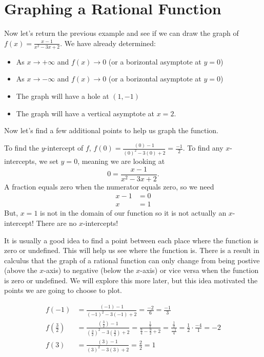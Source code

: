 \documentclass{ximera}
\begin{document}
\section{Graphing a Rational Function}

Now let's return the previous example and see if we can draw the graph of $f(x)=\frac{x-1}{x^2-3x+2}$.  We have already determined:

\begin{itemize}
\item As $x \to +\infty$ and $f(x) \to 0$ (or a borizontal asymptote at $y=0$)
\item As $x \to -\infty$ and $f(x) \to 0$ (or a borizontal asymptote at $y=0$)
\item The graph will have a hole at $(1,-1)$
\item The graph will have a vertical asymptote at $x=2$.
\end{itemize}

Now let's find a few additional points to help us graph the function.

To find the $y$-intercept of $f$, $f(0)=\frac{(0)-1}{(0)^2-3(0)+2}=\frac{-1}{2}$.  To find any $x$-intercepts, we set $y=0$, meaning we are looking at
$$0=\frac{x-1}{x^2-3x+2}.$$
A fraction equals zero when the numerator equals zero, so we need
\begin{align*}
x-1&=0\\
x&=1
\end{align*}
But, $x=1$ is not in the domain of our function so it is not actually an $x$-intercept!  There are no $x$-intercepts!

It is usually a good idea to find a point between each place where the function is zero or undefined.  This will help us see where the function is.  There is a result in calculus that the graph of a rational function can only change from being postive (above the $x$-axis) to negative (below the $x$-axis) or vice versa when the function is zero or undefined.  We will explore this more later, but this idea motivated the points we are going to choose to plot.

\begin{align*}
f(-1)&=\frac{(-1)-1}{(-1)^2-3(-1)+2}=\frac{-2}{6}=\frac{-1}{3}\\
f\left(\frac{3}{2}\right)&=\frac{\left(\frac{3}{2}\right)-1}{\left(\frac{3}{2}\right)^2-3\left(\frac{3}{2}\right)+2}=\frac{\frac{1}{2}}{\frac{9}{4}-\frac{9}{2}+2}=\frac{\frac{1}{2}}{\frac{-1}{4}}=\frac{1}{2} \cdot \frac{-4}{1}=-2\\
f(3)&=\frac{(3)-1}{(3)^2-3(3)+2}=\frac{2}{2}=1
\end{align*} 
\end{document}
